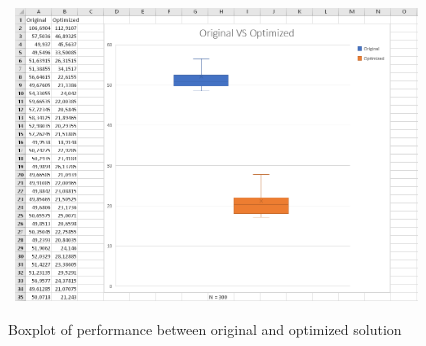 \begin{figure}[H]
    \centering\
    \includegraphics[width = 0.95\textwidth ]{figures/boxplots.png}
    \caption{Boxplot of performance between original and optimized solution}
    \label{fig:boxplots}
\end{figure}



\newpage
\vspace{0.5cm}


